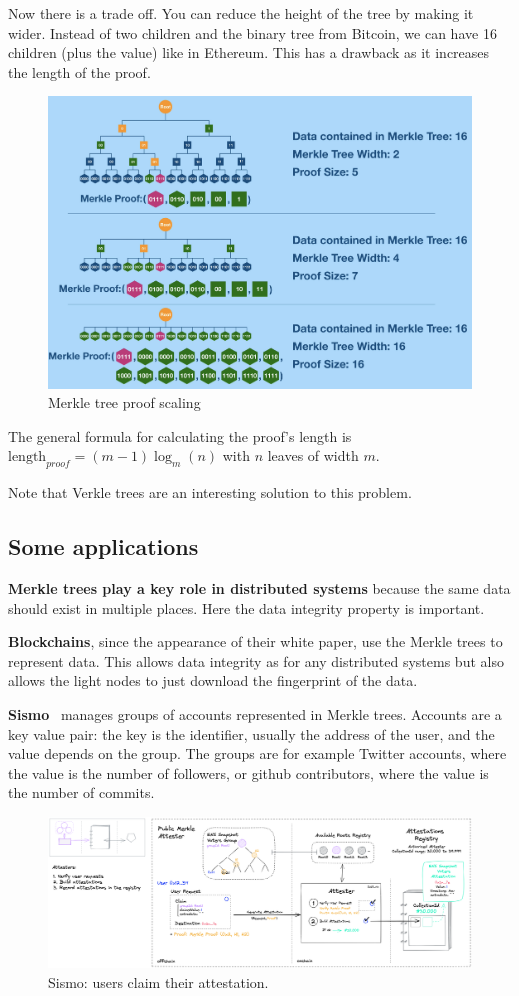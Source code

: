 Now there is a trade off. You can reduce the height of the tree by making it wider. Instead of two children and the binary tree from Bitcoin, we can have 16 children (plus the value) like in Ethereum. This has a drawback as it increases the length of the proof. 
\begin{figure}[H]
    \centering
    \includegraphics[width=0.7\linewidth]{background/Merklescaling.png}
    \caption{Merkle tree proof scaling \cite{merkleproofscaling}}
    \label{fig:Merklewidth}
\end{figure}

The general formula for calculating the proof's length is $\text{length}_{proof}=(m-1)\log_m(n)$ with $n$ leaves of width $m$.

Note that 
Verkle trees \cite{verkle} are an interesting solution to this problem.

\subsection{Some applications}
\textbf{Merkle trees play a key role in distributed systems} because the same data should exist in multiple places. Here the data integrity property is important.

\textbf{Blockchains}, since the appearance of their white paper, use the Merkle trees to represent data. This allows data integrity as for any distributed systems but also allows the light nodes to just download the fingerprint of the data.  

\textbf{Sismo}~\cite{sismo} manages groups of accounts represented in Merkle trees. Accounts are a key value pair: the key is the identifier, usually the address of the user, and the value depends on the group. The groups are for example Twitter accounts, where the value is the number of followers, or github contributors, where the value is the number of commits. 
\begin{figure}[H]
    \centering
    \includegraphics[width=1.\linewidth]{background/sismo2.png}
    \caption{Sismo: users claim their attestation.\cite{sismo}}
    \label{fig:sismo}
\end{figure}



